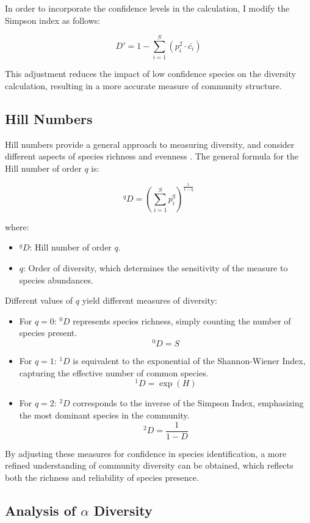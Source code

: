 \documentclass[a4paper,12pt]{article}
\begin{document}
In order to incorporate the confidence levels in the calculation, I modify the Simpson index as follows:

\[
D' = 1 - \sum_{i=1}^{S} \left( p_i^2 \cdot \bar{c_i} \right)
\]

This adjustment reduces the impact of low confidence species on the diversity calculation, resulting in a more accurate measure of community structure.

\subsection{Hill Numbers}
Hill numbers provide a general approach to measuring diversity, and consider different aspects of species richness and evenness \citep{jost2007partitioning}. The general formula for the Hill number of order $q$ is:

\[
{}^qD = \left( \sum_{i=1}^{S} p_i^q \right)^{\frac{1}{1-q}}
\]

where:
\begin{itemize}
    \item ${}^qD$: Hill number of order $q$.
    \item $q$: Order of diversity, which determines the sensitivity of the measure to species abundances.
\end{itemize}

Different values of $q$ yield different measures of diversity:
\begin{itemize}
    \item For $q = 0$: ${}^0D$ represents species richness, simply counting the number of species present.
    \[
    {}^0D = S
    \]
    \item For $q = 1$: ${}^1D$ is equivalent to the exponential of the Shannon-Wiener Index, capturing the effective number of common species.
    \[
    {}^1D = \exp(H)
    \]
    \item For $q = 2$: ${}^2D$ corresponds to the inverse of the Simpson Index, emphasizing the most dominant species in the community.
    \[
    {}^2D = \frac{1}{1-D}
    \]
\end{itemize}

By adjusting these measures for confidence in species identification, a more refined understanding of community diversity can be obtained, which reflects both the richness and reliability of species presence.

\subsection{Analysis of $\alpha$ Diversity}
\end{document}
